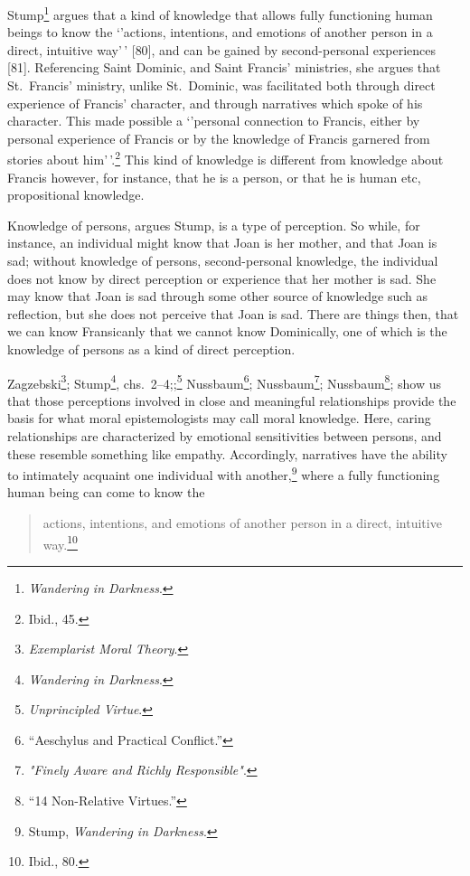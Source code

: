 \documentclass[
  12pt,
]{book}
\theoremstyle{definition}
\theoremstyle{definition}
\theoremstyle{definition}
\theoremstyle{definition}
\theoremstyle{remark}
\begin{document}
Stump\footnote{\emph{Wandering in {Darkness}}.} argues that a kind of knowledge that allows fully functioning human beings to know the `'actions, intentions, and emotions of another person in a direct, intuitive way'\,' {[}80{]}, and can be gained by second-personal experiences
{[}81{]}. Referencing Saint Dominic, and Saint Francis' ministries, she argues that St.~Francis' ministry, unlike St.~Dominic, was facilitated both through
direct experience of Francis' character, and through narratives which
spoke of his character. This made possible a `'personal
connection to Francis, either by personal experience of Francis or by
the knowledge of Francis garnered from stories about him'\,'.\footnote{Ibid., 45.} This kind of knowledge is different from knowledge about Francis however, for
instance, that he is a person, or that he is human etc, propositional knowledge.

Knowledge of persons, argues Stump, is a type of perception. So while,
for instance, an individual might know that Joan is her mother, and
that Joan is sad; without knowledge of persons, second-personal knowledge, the individual does not know by direct perception or experience that her mother is sad. She may know that Joan is sad through some other source of knowledge such as reflection, but she does not perceive that Joan is sad. There are things then, that we can know Fransicanly that we cannot know Dominically, one of which is the knowledge of persons as a kind of direct perception.

Zagzebski\footnote{\emph{Exemplarist {Moral Theory}}.}; Stump\footnote{\emph{Wandering in {Darkness}}.}, chs.~2--4;;\footnote{\emph{Unprincipled {Virtue}}.} Nussbaum\footnote{{``Aeschylus and Practical Conflict.''}}; Nussbaum\footnote{\emph{"{Finely Aware} and {Richly Responsible}"}.}; Nussbaum\footnote{{``14 {Non-Relative Virtues}.''}}; show us that those perceptions involved in close and meaningful relationships provide the basis for what moral epistemologists may call moral knowledge. Here, caring relationships are characterized by emotional sensitivities between persons, and these resemble something like empathy. Accordingly, narratives have the ability to intimately acquaint one individual with another,\footnote{Stump, \emph{Wandering in {Darkness}}.} where a fully functioning human being can come to know the

\begin{quote}
actions, intentions, and emotions of another person in a direct, intuitive way.\footnote{Ibid., 80.}
\end{quote}
\end{document}
